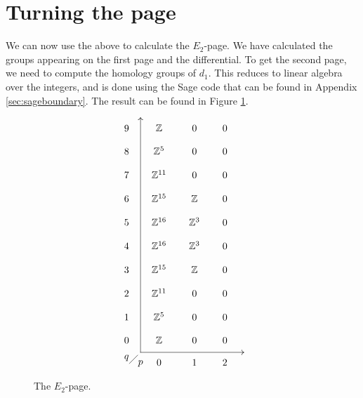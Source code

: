 \section{Turning the page}
\label{sec:rand}

We can now use the above to calculate the $E_2$-page. We have
calculated the groups appearing on the first page and the
differential. To get the second page, we need to compute the homology
groups of $d_1$. This reduces to linear algebra over the integers, and
is done using the Sage code that can be found in Appendix
\ref{sec:sageboundary}. The result can be found in Figure
\ref{fig:e2}.

\begin{figure}[ht]
  \[ \xy
  (5,4); (5,-80); **\dir{-}; (5,4); *\dir{>};
  (5,-80); (42,-80); **\dir{-}; *\dir{<};
  (0,-82)*{q}; (5,-84)*{p};
  (1,-84); (4,-81); **\dir{-};
  (0,0)\xymatrix@R=1em@C=1.7em{
    9 & \Z & 0 & 0 \\
    8 & \Z^5 & 0 & 0 \\
    7 & \Z^{11} & 0 & 0 \\
    6 & \Z^{15} & \Z & 0 \\
    5 & \Z^{16} & \Z^{3} & 0 \\
    4 & \Z^{16} & \Z^{3} & 0 \\
    3 & \Z^{15} & \Z & 0 \\
    2 & \Z^{11} & 0 & 0 \\
    1 & \Z^{5} & 0 & 0 \\
    0 & \Z & 0 & 0 \\
    & 0 & 1 & 2
  } \endxy \]
  \caption{The $E_2$-page.}
  \label{fig:e2}
\end{figure}

